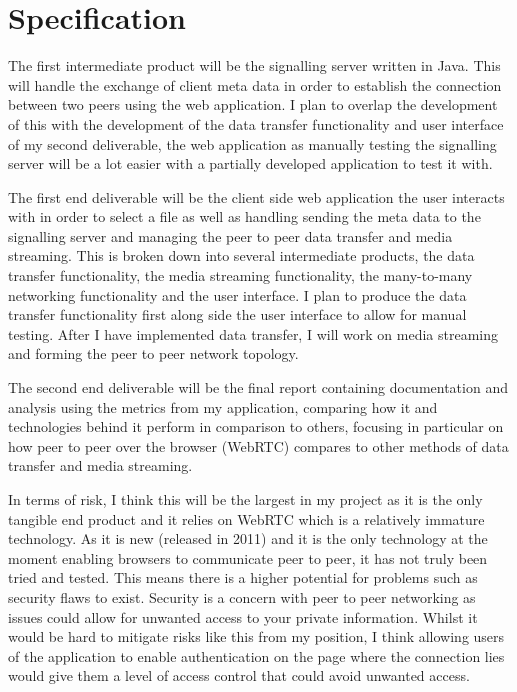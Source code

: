 \documentclass[]{report}
\begin{document}
	\section{Specification}
			The first intermediate product will be the signalling server written in Java. This will handle the exchange of client meta data in order to establish the connection between two peers using the web application. I plan to overlap the development of this with the development of the data transfer functionality and user interface of my second deliverable, the web application as manually testing the signalling server will be a lot easier with a partially developed application to test it with.
			
			The first end deliverable will be the client side web application the user interacts with in order to select a file as well as handling sending the meta data to the signalling server and managing the peer to peer data transfer and media streaming. This is broken down into several intermediate products, the data transfer functionality, the media streaming functionality, the many-to-many networking functionality and the user interface. I plan to produce the data transfer functionality first along side the user interface to allow for manual testing. After I have implemented data transfer, I will work on media streaming and forming the peer to peer network topology.
			
			The second end deliverable will be the final report containing documentation and analysis using the metrics	from my application, comparing how it and technologies behind it perform in comparison to others, focusing in particular on how peer to peer over the browser (WebRTC) compares to other methods of data transfer and media streaming.
			
			In terms of risk, I think this will be the largest in my project as it is the only tangible end product and it relies on WebRTC which is a relatively immature technology. As it is new (released in 2011) and it is the only technology at the moment enabling browsers to communicate peer to peer, it has not truly been tried and tested. This means there is a higher potential for problems such as security flaws to exist. Security is a concern with peer to peer networking as issues could allow for unwanted access to your private information. Whilst it would be hard to mitigate risks like this from my position, I think allowing users of the application to enable authentication on the page where the connection lies would give them a level of access control that could avoid unwanted access.
			
\end{document}
